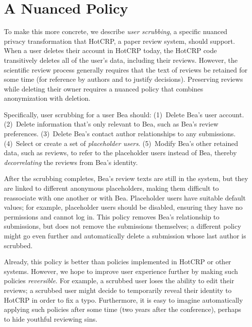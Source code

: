 \section{A Nuanced Policy}
\label{design:eg}


To make this more concrete, we describe \emph{user scrubbing}, a specific nuanced privacy
transformation that HotCRP, a paper review system, should support.
%
When a user deletes their account in HotCRP today, the HotCRP code transitively deletes all of the
user's data, including their reviews.
%
However, the scientific review process generally requires that the text of
reviews be retained for some time (for reference by authors and to justify
decisions).
%
Preserving reviews while deleting their owner requires a nuanced policy
that combines anonymization with deletion.


Specifically, user scrubbing for a user Bea should:
%
(1)~Delete Bea's user account.
%
(2)~Delete information that's only relevant to Bea, such as Bea's review
preferences.
%
(3)~Delete Bea's contact author relationships to any submissions.
%
(4)~Select or create a set of \emph{placeholder users}.
%
(5)~Modify Bea's other retained data, such as reviews, to refer to the
placeholder users instead of Bea, thereby \emph{decorrelating} the reviews from Bea's identity.


After the scrubbing completes, Bea's review texts are still in the system, but
they are linked to different anonymous placeholders, making them difficult to
reassociate with one another or with Bea.
%
Placeholder users have suitable default values; for example, placeholder
users should be disabled,
ensuring they have no permissions and cannot log in.
%
This policy removes Bea's relationship to submissions, but does not remove the
submissions themselves; a different policy might go even further and
automatically delete a submission whose last author is scrubbed.
%

Already, this policy is better than policies implemented in HotCRP or other systems.
%
However, we hope to improve user experience further by making such policies
\emph{reversible}.
%
For example, a scrubbed user loses the ability to edit their reviews; a
scrubbed user might decide to temporarily reveal their identity to HotCRP in
order to fix a typo.
%
Furthermore, it is easy to imagine automatically applying such policies
after some time (\eg two years after the conference), perhaps to hide youthful
reviewing sins.
%

